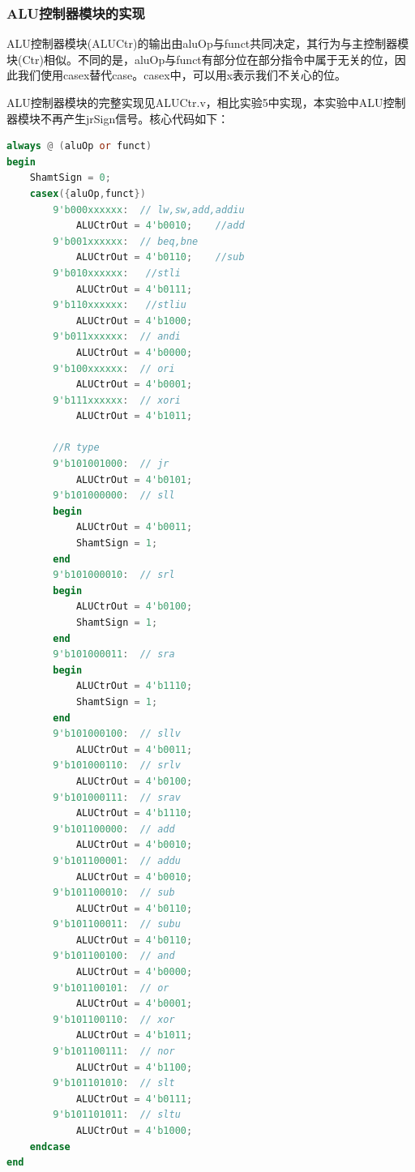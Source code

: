 \documentclass[UTF8]{ctexart}
\begin{document}
\subsubsection{ALU控制器模块的实现}
ALU控制器模块(ALUCtr)的输出由aluOp与funct共同决定，其行为与主控制器模块(Ctr)相似。不同的是，aluOp与funct有部分位在部分指令中属于无关的位，因此我们使用casex替代case。casex中，可以用x表示我们不关心的位。\par
ALU控制器模块的完整实现见ALUCtr.v，相比实验5中实现，本实验中ALU控制器模块不再产生jrSign信号。核心代码如下：
\begin{lstlisting}[language=verilog]
always @ (aluOp or funct)
begin
    ShamtSign = 0;
    casex({aluOp,funct})
        9'b000xxxxxx:  // lw,sw,add,addiu
            ALUCtrOut = 4'b0010;    //add
        9'b001xxxxxx:  // beq,bne
            ALUCtrOut = 4'b0110;    //sub
        9'b010xxxxxx:   //stli
            ALUCtrOut = 4'b0111;
        9'b110xxxxxx:   //stliu
            ALUCtrOut = 4'b1000;
        9'b011xxxxxx:  // andi
            ALUCtrOut = 4'b0000;
        9'b100xxxxxx:  // ori
            ALUCtrOut = 4'b0001;
        9'b111xxxxxx:  // xori
            ALUCtrOut = 4'b1011;
        
        //R type
        9'b101001000:  // jr
            ALUCtrOut = 4'b0101;
        9'b101000000:  // sll
        begin
            ALUCtrOut = 4'b0011;
            ShamtSign = 1;
        end
        9'b101000010:  // srl
        begin
            ALUCtrOut = 4'b0100;
            ShamtSign = 1;
        end
        9'b101000011:  // sra
        begin
            ALUCtrOut = 4'b1110;
            ShamtSign = 1;
        end
        9'b101000100:  // sllv
            ALUCtrOut = 4'b0011;
        9'b101000110:  // srlv
            ALUCtrOut = 4'b0100;
        9'b101000111:  // srav
            ALUCtrOut = 4'b1110;
        9'b101100000:  // add
            ALUCtrOut = 4'b0010;
        9'b101100001:  // addu
            ALUCtrOut = 4'b0010;
        9'b101100010:  // sub
            ALUCtrOut = 4'b0110;
        9'b101100011:  // subu
            ALUCtrOut = 4'b0110;
        9'b101100100:  // and
            ALUCtrOut = 4'b0000;
        9'b101100101:  // or
            ALUCtrOut = 4'b0001;
        9'b101100110:  // xor
            ALUCtrOut = 4'b1011;
        9'b101100111:  // nor
            ALUCtrOut = 4'b1100;
        9'b101101010:  // slt
            ALUCtrOut = 4'b0111;
        9'b101101011:  // sltu
            ALUCtrOut = 4'b1000;
    endcase
end
\end{lstlisting}
\end{document}
